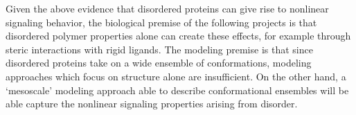 \documentclass[../AdvancementSummary.tex]{subfiles}
\begin{document}
Given the above evidence that disordered proteins can give rise to nonlinear signaling behavior, the biological premise of the following projects is that disordered polymer properties alone can create these effects, for example through steric interactions with rigid ligands. 
The modeling premise is that since disordered proteins take on a wide ensemble of conformations, modeling approaches which focus on structure alone are insufficient. On the other hand, a `mesoscale' modeling approach able to describe conformational ensembles will be able capture the nonlinear signaling properties arising from disorder.

\end{document}
